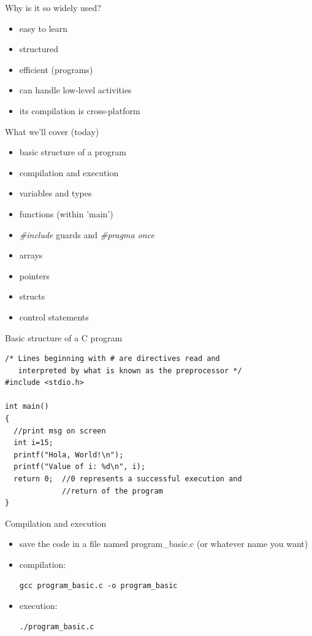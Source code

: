 \documentclass[10pt]{beamer}
\begin{document}
\begin{frame}[fragile]{Why is it so widely used?}
\begin{itemize}
\item easy to learn
\item structured
\item efficient (programs)
\item can handle low-level activities
\item its compilation is cross-platform
\end{itemize}
\end{frame}


\begin{frame}[fragile]{What we'll cover (today)}
\begin{itemize}
\item basic structure of a program
\item compilation and execution
\item variables and types
\item functions (within 'main')
\item \textit{\#include} guards and \textit{\#pragma once}
\item arrays
\item pointers
\item structs
\item control statements
\end{itemize}
\end{frame}

\begin{frame}[fragile]{Basic structure of a C program}
\begin{lstlisting}
/* Lines beginning with # are directives read and
   interpreted by what is known as the preprocessor */
#include <stdio.h>

int main()
{
  //print msg on screen
  int i=15;
  printf("Hola, World!\n");
  printf("Value of i: %d\n", i);
  return 0;  //0 represents a successful execution and
             //return of the program
}
\end{lstlisting}
\end{frame}


\begin{frame}[fragile]{Compilation and execution}
\begin{itemize}
\item save the code in a file named program\_basic.c (or whatever name you want)
\item compilation:
\begin{lstlisting}
gcc program_basic.c -o program_basic
\end{lstlisting}
\item execution:
\begin{lstlisting}
./program_basic.c
\end{lstlisting}
\end{itemize}
\end{frame}
\end{document}
